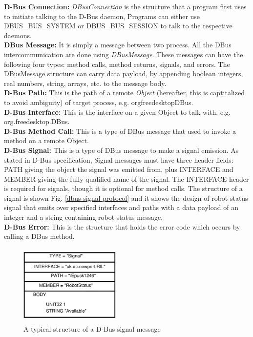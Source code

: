 \documentclass{ifacconf}
\begin{document}
\textbf{D-Bus Connection: }
\textit{DBusConnection} is the structure that a program first uses to initiate talking to the D-Bus daemon,  Programs can either use DBUS\_BUS\_SYSTEM or DBUS\_BUS\_SESSION to talk to the respective daemons.\\
\textbf{DBus Message: }
It is simply a message between two process. All the DBus intercommunication are done using \textit{DBusMessage}. These messages can have the following four types: method calls, method returns, signals, and errors. The DBusMessage structure can carry data payload, by appending boolean integers, real numbers, string, arrays, etc. to the message body.\\ 
\textbf{D-Bus Path: }
This is the path of a remote \textit{Object} (hereafter, this is captitalized to avoid ambiguity) of target process, e.g.  \/org\/freedesktop\/DBus.\\
\textbf{D-Bus Interface: }
This is the interface on a given Object to talk with, e.g. org.freedesktop.DBus.\\
\textbf{D-Bus Method Call: }
This is a type  of DBus message that used to invoke a method on a remote Object.\\
\textbf{D-Bus Signal: }
This is a type of DBus message to make a signal emission.  As stated in D-Bus specification, Signal messages must have three header fields: PATH giving the object the signal was emitted from, plus INTERFACE and MEMBER giving the fully-qualified name of the signal. The INTERFACE header is required for signals, though it is optional for method calls. The structure of a signal is shown Fig. \ref{dbus-signal-protocol} and  it shows the design of robot-status signal that emits over specified interfaces and paths with a data payload of an integer and a string containing robot-status message.\\
\textbf{D-Bus Error: }
This is the structure that holds the error code which occurs by calling a DBus method.
\begin{figure}
\begin{center}
\includegraphics[width=5cm,height=4cm]{./dia-files/dbus-signal-protocol}    %
\caption{A typical structure of a D-Bus signal message} 
\label{fig:abstract-arch}
\end{center}
\end{figure}
\end{document}
